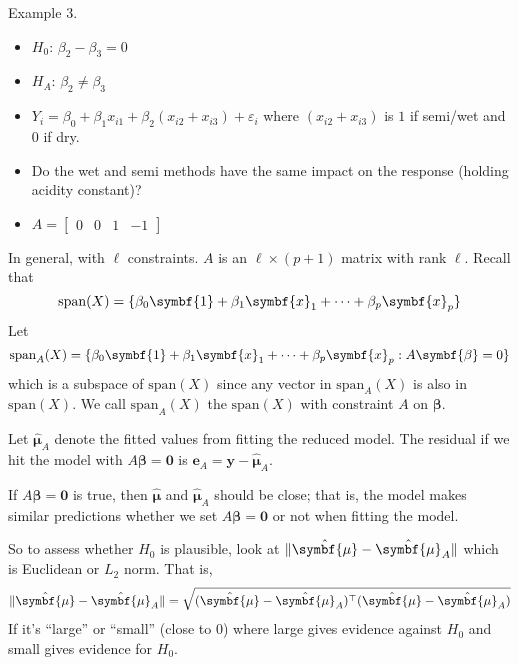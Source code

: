 \begin{Example}{}{}
\begin{itemize}
    \end{itemize}
    Example 3.
    \begin{itemize}
        \item $ H_0 $: $ \beta_2-\beta_3=0 $
        \item $ H_A $: $ \beta_2\neq \beta_3 $
        \item $ Y_i=\beta_0+\beta_1x_{i1}+\beta_2(x_{i2}+x_{i3})+\varepsilon_i $
              where $ (x_{i2}+x_{i3}) $ is
              $ 1 $ if semi/wet and $ 0 $ if dry.
        \item Do the wet and semi methods have the same impact
              on the response (holding acidity constant)?
        \item $ A=\begin{bmatrix}
                      0 & 0 & 1 & -1
                  \end{bmatrix} $
    \end{itemize}
\end{Example}

In general, with $ \ell $ constraints. $ A $
is an $ \ell \times (p+1) $ matrix
with rank $ \ell $. Recall
that
\[ \text{span}(X)=\set{\beta_0\symbf{1}+\beta_1\symbf{x}_1+
        \cdots+\beta_p\symbf{x}_p} \]
Let
\[ \text{span}_A(X)=\set{\beta_0\symbf{1}+\beta_1\symbf{x}_1+
        \cdots+\beta_p\symbf{x}_p:A\symbf{\beta}=0} \]
which is a subspace of $ \text{span}(X) $
since any vector in $ \text{span}_A(X) $
is also in $ \text{span}(X) $.
We call $ \text{span}_A(X) $ the
$ \text{span}(X) $ with constraint $ A $ on $ \symbf{\beta} $.

Let $ \hat{\symbf{\mu}}_A $
denote the fitted values from fitting the reduced model.
The residual if we hit the model with $ A\symbf{\beta}=\symbf{0} $
is $ \symbf{e}_A=\symbf{y}-\hat{\symbf{\mu}}_A $.

If $ A\symbf{\beta}=\symbf{0} $ is true, then
$ \hat{\symbf{\mu}} $ and $ \hat{\symbf{\mu}}_A $ should be close;
that is, the model makes similar predictions whether
we set $ A\symbf{\beta}=\symbf{0} $ or not when fitting the model.

So to assess whether $ H_0 $ is plausible,
look at $ \norm{\hat{\symbf{\mu}}-\hat{\symbf{\mu}}_A} $
which is Euclidean or $ L_2 $ norm. That is,
\[ \norm{\hat{\symbf{\mu}}-\hat{\symbf{\mu}}_A}=
    \sqrt{(\hat{\symbf{\mu}}-\hat{\symbf{\mu}}_A)^\top(\hat{\symbf{\mu}}-\hat{\symbf{\mu}}_A)} \]
If it's ``large'' or ``small'' (close to 0)
where large gives evidence against $ H_0 $
and small gives evidence for $ H_0 $.

